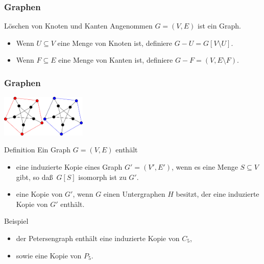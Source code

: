 \documentclass[aspectratio=1610, 11pt]{beamer}
\newcommand{\mytitle}{Graphen}
\begin{document}
\begin{frame}\frametitle{\mytitle}
	\begin{overprint}
	\begin{exampleblock}{L\"oschen von Knoten und Kanten}
		Angenommen $G=(V,E)$ ist ein Graph.
		\begin{itemize}
			\item Wenn $U\subseteq V$ eine Menge von Knoten ist, definiere $G-U=G[V\setminus U].$
			\item Wenn $F\subseteq E$ eine Menge von Kanten ist, definiere $G-F=(V,E\setminus F).$
		\end{itemize}
	\end{exampleblock}
	\end{overprint}
\end{frame}

\begin{frame}\frametitle{\mytitle}
\includegraphics[height=20mm]{images/subgraph.pdf}\hfill\includegraphics[height=20mm]{images/subgraphNonInduced.pdf}
	\begin{overprint}
		\onslide<1>
	\begin{block}{Definition}
		Ein Graph $G=(V,E)$ enth\"alt
		\begin{itemize}
			\item eine \alert{induzierte Kopie} eines Graph $G'=(V',E')$, wenn es eine Menge $S\subseteq V$ gibt, so da\ss\ $G[S]$ isomorph ist zu $G'$.
			\item eine \alert{Kopie} von $G'$, wenn $G$ einen Untergraphen $H$ besitzt, der eine induzierte Kopie von $G'$ enth\"alt.
		\end{itemize}
	\end{block}
		\onslide<2>
	\begin{exampleblock}{Beispiel}
		\begin{itemize}
			\item der Petersengraph enth\"alt eine induzierte Kopie von $C_5$,
			\item sowie eine Kopie von $P_5$.
		\end{itemize}
	\end{exampleblock}
	\end{overprint}
\end{frame}
\end{document}
